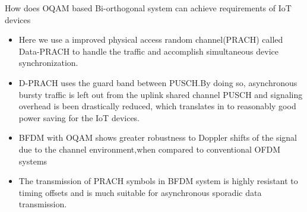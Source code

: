\documentclass{beamer}
\begin{document}
\begin{frame}{How does OQAM based Bi-orthogonal system can achieve requirements of IoT devices}
\begin{itemize}
    \item Here we use a improved physical access random channel(PRACH) called Data-PRACH to handle the traffic and accomplish simultaneous device synchronization.
    \item D-PRACH uses the guard band between PUSCH.By doing so, asynchronous bursty traffic is left out from the uplink shared channel PUSCH and signaling overhead is been drastically reduced, which translates in to reasonably good power saving for the IoT devices.
    \item BFDM with OQAM shows greater robustness to Doppler shifts of the signal due to the channel environment,when compared to conventional OFDM systems
    \item The transmission of PRACH symbols in BFDM system is highly resistant to timing offsets and is much suitable for asynchronous sporadic data transmission.
\end{itemize}
\end{frame}
\end{document}
